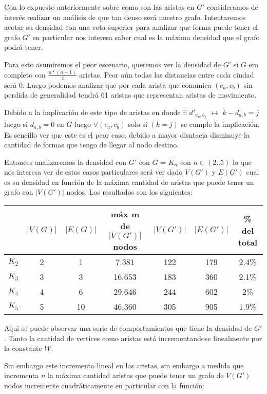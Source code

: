 \documentclass[12pt]{article}
\begin{document}
Con lo expuesto anteriormente sobre como son las aristas en $G'$ consideramos de interés realizar un análisis de que tan denso será nuestro grafo. Intentaremos acotar su densidad con una cota superior para analizar que forma puede tener el grafo $G'$ en particular nos interesa saber cual es la máxima densidad que el grafo podrá tener.

Para esto asumiremos el peor escenario, queremos ver la densidad de $G'$ si $G$ era completo con $\frac{n*(n - 1)}{2}$ aristas. Peor aún todas las distancias entre cada ciudad será 0. Luego podemos analizar que por cada arista que comunica $(c_a,c_b)$ sin perdida de generalidad tendrá 61 aristas que representan aristas de movimiento. 

Debido a la implicación de este tipo de aristas en donde $\exists$ $d'_{a_k,b_j}$ $\leftrightarrow$  $k - d_{a,b} = j$ luego si $d_{a,b} = 0$ en $G$ luego $\forall (c_a, c_b)$ solo si $(k = j)$ se cumple la implicación. Es sencillo ver que este es el peor caso, debido a mayor disntacia disminuye la cantidad de formas que tengo de llegar al nodo destino.

Entonces analizaremos la densidad con $G'$ con $G$ = $K_n$ con $n \in (2..5)$ lo que nos interesa ver de estos casos particulares será ver dado $V(G')$ y $E(G')$ cual es su densidad en función de la máxima cantidad de aristas que puede tener un grafo con $|V(G')|$ nodos. Los resultados son los siguientes:

\begin{center}
	\begin{tabular}{| c |c | c || c | c | c | c |} 
		\hline
		& $|V(G)|$ & $|E(G)|$ & máx m de $|V(G')|$ nodos & $|V(G')|$ & $|E(G')|$ & \% del total \\ [0.5ex] 
		\hline\hline
		$K_2$ & 2 & 1 & 7.381 & 122 & 179 & 2.4\% \\ 
		\hline
		$K_3$ & 3 & 3 & 16.653 & 183 & 360 & 2.1\% \\
		\hline
		$K_4$ & 4 & 6 & 29.646 & 244 & 602 & 2\% \\
		\hline
		$K_5$ & 5 & 10 & 46.360 & 305 & 905 & 1.9\% \\
		\hline
	\end{tabular}
\end{center}

Aqui se puede observar una serie de comportamientos que tiene la densidad de $G'$. Tanto la cantidad de vertices como aristas está incrementandose linealmente por la constante $W$. 

Sin embargo este incremento lineal en las aristas, sin embargo a medida que incrementa $n$ la máxima cantidad aristas que puede tener un grafo de $V(G')$ nodos incremente cuadráticamente en particular con la función:
\end{document}
